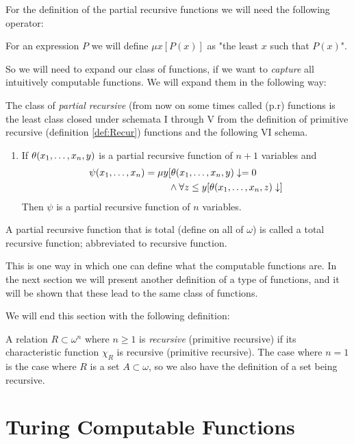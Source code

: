 \documentclass[../main.tex]{subfiles}
\begin{document}
For the definition of the partial recursive functions we will need the
following operator:
\begin{defi}
	For an expression $P$ we will define $\mu x [P(x)]$ as "the least $x$
	such that $P(x)$".
\end{defi}
So we will need to expand our class of functions, if we want to
\textit{capture} all intuitively computable functions. 
We will expand them in the following way:
\begin{defi}
		The class of \textit{partial recursive} (from now on some times
		called (p.r) functions is the least class closed under schemata
		I through V from the definition of primitive recursive
		(definition \ref{def:Recur})
		functions and the following VI schema. 
		\begin{enumerate}[label=\Roman*., start=6]
			\item If $\theta(x_1,\ldots,x_n,y)$ is a partial recursive function
				of $n+1$ variables and 
				\begin{align*}
					\psi(x_1,\ldots,x_n)=\mu
					y&[\theta(x_1,\ldots,x_n,y)\downarrow=0\\
						&\wedge \forall z\leq y
					[\theta(x_1,\ldots,x_n,z)\downarrow]
				\end{align*}
				Then $\psi$ is a partial recursive function of
				$n$ variables.
		\end{enumerate}
		A partial recursive function that is total (define on all of
		$\omega$) is called a total
		recursive function; abbreviated to recursive function.
\end{defi}

This is one way in which one can define what the computable functions are. In
the next section we will present another definition of a type of functions,
and it will be shown that these lead to the same class of functions.

We will end this section with the following definition:
\begin{defi}
	A relation $R\subset\omega^n$ where $n\geq 1$ is \textit{recursive} (primitive
	recursive) if its characteristic function $\chi_R$ is recursive
	(primitive recursive). The case where $n=1$ is the case where $R$ is a
	set $A\subset\omega$, so we also have the definition of a set being
	recursive.
\end{defi}

\section{Turing Computable Functions}
\end{document}
